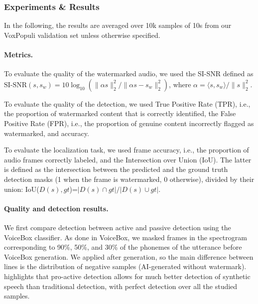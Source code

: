 \subsubsection{Experiments \& Results}
In the following, the results are averaged over 10k samples of 10s from our VoxPopuli validation set unless otherwise specified.

\paragraph{Metrics.} 
To evaluate the quality of the watermarked audio, we used the SI-SNR defined as $\textrm{SI-SNR}(s, s_w) = 10 \log_{10} \left( \| \alpha s \|_2^2 / \| \alpha s - s_w \|_2^2 \right)$, where $\alpha = \langle s, s_w \rangle / \| s \|_2^2$.

To evaluate the quality of the detection, we used True Positive Rate (TPR), i.e., the proportion of watermarked content that is correctly identified, the False Positive Rate (FPR), i.e., the proportion of genuine content incorrectly flagged as watermarked, and accuracy. 

To evaluate the localization task, we used frame accuracy, i.e., the proportion of audio frames correctly labeled, and the Intersection over Union (IoU). 
The latter is defined as the intersection between the predicted and the ground truth detection masks (1 when the frame is watermarked, 0 otherwise), divided by their union: IoU($D(s), gt$)=$|D(s) \cap gt | / |D(s) \cup gt |$. 


\paragraph{Quality and detection results.} 

We first compare detection between active and passive detection using the VoiceBox classifier.
As done in VoiceBox, we masked frames in the spectrogram corresponding to 90\%, 50\%, and 30\% of the phonemes of the utterance before VoiceBox generation. 
We applied \seamlesswm after generation, so the main difference between lines is the distribution of negative samples (AI-generated without watermark).
 highlights that pro-active detection allows for much better detection of synthetic speech than traditional detection, with perfect detection over all the studied samples.


